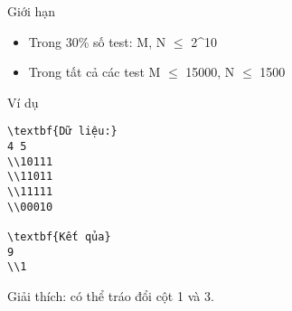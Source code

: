 Giới hạn  
\begin{itemize}
	\item     Trong 30\% số test: M, N  $\le$  2^10   
	\item     Trong tất cả các test M  $\le$  15000, N  $\le$  1500   
\end{itemize}
   Ví dụ  
\begin{verbatim}
\textbf{Dữ liệu:}
4 5
\\10111
\\11011
\\11111
\\00010

\textbf{Kết qủa}
9
\\1
\end{verbatim}

   Giải thích: có thể tráo đổi cột 1 và 3.